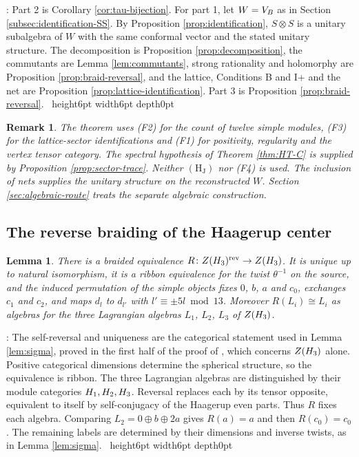 \documentclass[leqno]{article}
\let\cal\relax
\newcommand{\cal}{\mathcal}
\newcommand{\qed}{\hfill \vrule height6pt  width6pt depth0pt}
\newcommand{\co}{\colon}
\newcommand{\ot}{\otimes}
\newtheorem{lemma}[thm]{Lemma}
\newtheorem{remark}[thm]{Remark}
\newenvironment{proof}[1][]{\noindent {\it Proof #1} : }{\hbox{~}\qed
\smallskip
}
\numberwithin{equation}{section}
\begin{document}
\begin{proof}
Part 2 is Corollary \ref{cor:tau-bijection}. For part 1, let $W = V_{\cal B}$ as in Section \ref{subsec:identification-SS}. By Proposition \ref{prop:identification}, $S \ot S$ is a unitary subalgebra of $W$ with the same conformal vector and the stated unitary structure. The decomposition is Proposition \ref{prop:decomposition}, the commutants are Lemma \ref{lem:commutants}, strong rationality and holomorphy are Proposition \ref{prop:braid-reversal}, and the lattice, Conditions B and I+ and the net are Proposition \ref{prop:lattice-identification}. Part 3 is Proposition \ref{prop:braid-reversal}.
\end{proof}

\begin{remark}\normalfont
\label{rem:status-N}
The theorem uses (F2) for the count of twelve simple modules, (F3) for the lattice-sector identifications and (F1) for positivity, regularity and the vertex tensor category. The spectral hypothesis of Theorem \ref{thm:HT-C} is supplied by Proposition \ref{prop:sector-trace}. Neither $\mathrm{(H_J)}$ nor (F4) is used. The inclusion of nets supplies the unitary structure on the reconstructed $W$. Section \ref{sec:algebraic-route} treats the separate algebraic construction.
\end{remark}


\subsection{The reverse braiding of the Haagerup center}

\begin{lemma}
\label{lem:ZH3-self-reverse}
There is a braided equivalence $R \co Z(\cal H_3)^{\mathrm{rev}} \to Z(\cal H_3)$. It is unique up to natural isomorphism, it is a ribbon equivalence for the twist $\theta^{-1}$ on the source, and the induced permutation of the simple objects fixes $0$, $b$, $a$ and $c_0$, exchanges $c_1$ and $c_2$, and maps $d_l$ to $d_{l'}$ with $l' \equiv \pm5l \bmod 13$. Moreover $R(L_i) \cong L_i$ as algebras for the three Lagrangian algebras $L_1$, $L_2$, $L_3$ of $Z(\cal H_3)$.
\end{lemma}

\begin{proof}
The self-reversal and uniqueness are the categorical statement used in Lemma \ref{lem:sigma}, proved in the first half of the proof of \cite[Proposition 7.12(1)]{ArhII}, which concerns $Z(\cal H_3)$ alone. Positive categorical dimensions determine the spherical structure, so the equivalence is ribbon. The three Lagrangian algebras are distinguished by their module categories $\cal H_1,\cal H_2,\cal H_3$. Reversal replaces each by its tensor opposite, equivalent to itself by self-conjugacy of the Haagerup even parts. Thus $R$ fixes each algebra. Comparing $L_2 = 0\oplus b\oplus2a$ gives $R(a) = a$ and then $R(c_0) = c_0$. The remaining labels are determined by their dimensions and inverse twists, as in Lemma \ref{lem:sigma}.
\end{proof}
\end{document}
